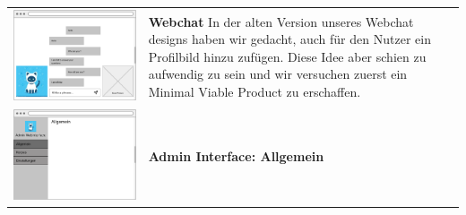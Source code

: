 \begin{tabular}{C{6cm}  L{7cm}}
    \includegraphics[width=\linewidth]{bilder/old vers. UI Design/WebChat.png}                   & \textbf{Webchat} \newline
    In der alten Version unseres Webchat designs haben wir gedacht, auch für den
    Nutzer ein Profilbild hinzu zufügen. Diese Idee aber schien zu aufwendig zu sein und wir versuchen
    zuerst ein Minimal Viable Product zu erschaffen.                                                                                           \\
    \includegraphics[width=\linewidth]{bilder/old vers. UI Design/Admin Interface Allgemein.png} & \textbf{Admin Interface: Allgemein} \newline

\end{tabular}
